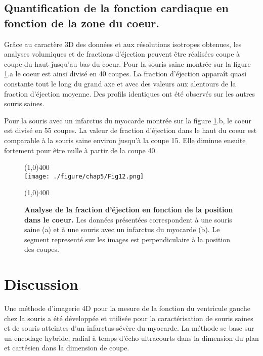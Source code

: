 \subsection{Quantification de la fonction cardiaque en fonction de la zone du coeur.}

Grâce au caractère 3D des données et aux résolutions isotropes obtenues, les analyses volumiques et de fractions d'éjection peuvent être réalisées coupe à coupe du haut jusqu'au bas du coeur.
Pour la souris saine montrée sur la figure \ref{fig:FractionEjectionCoupe}.a le coeur est ainsi divisé en 40 coupes. La fraction d'éjection apparaît quasi constante tout le long du grand axe et avec des valeurs aux alentours de la fraction d'éjection moyenne. Des profils identiques ont été observés sur les autres souris saines.

Pour la souris avec un infarctus du myocarde montrée sur la figure \ref{fig:FractionEjectionCoupe}.b, le coeur est divisé en 55 coupes. La valeur de fraction d'éjection dans le haut du coeur est comparable à la souris saine environ jusqu'à la coupe 15. Elle diminue ensuite fortement pour être nulle à partir de la coupe 40.

\begin{figure}[H]
\centering
\line(1,0){400} \\
\texttt{[image: ./figure/chap5/Fig12.png]}
\caption[Analyse de la fraction d'éjection en fonction de la position dans le coeur.]{\label{fig:FractionEjectionCoupe} \textbf{Analyse de la fraction d'éjection en fonction de la position dans le coeur.} Les données présentées correspondent à une souris saine (a) et à une souris avec un infarctus du myocarde (b). Le segment representé sur les images est perpendiculaire à la position des coupes.}
\line(1,0){400} \\ 
\end{figure}

\section{Discussion}


Une méthode d’imagerie 4D pour la mesure de la fonction du ventricule gauche chez la souris a été développée et utilisée pour la caractérisation de souris saines et de souris atteintes d’un infarctus sévère du myocarde.
La méthode se base sur un encodage hybride, radial à temps d’écho ultracourts dans la dimension du plan et cartésien dans la dimension de coupe. 

